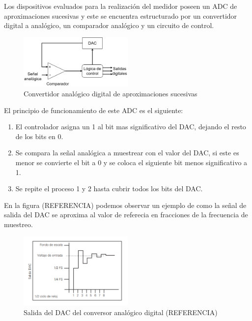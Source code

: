           \par Los dispositivos evaluados para la realización del medidor poseen un ADC de aproximaciones sucesivas y este se encuentra estructurado por un convertidor digital a analógico, un comparador analógico y un circuito de control.

          \begin{figure}[H]
            \centering
            \includegraphics[width=0.5\textwidth]{../Imagenes/ADC.png}
            \caption{Convertidor analógico digital de aproximaciones sucesivas}
            \label{fig:ADC_aproximaciones_sucesivas}
          \end{figure}

          \par El principio de funcionamiento de este ADC es el siguiente:
          \begin{enumerate}
            \item El controlador asigna un 1 al bit mas significativo del DAC, dejando el resto de los bits en 0.
            \item Se compara la señal analógica a muestrear con el valor del DAC, si este es menor se convierte el bit a 0 y se coloca el siguiente bit menos significativo a 1.
            \item Se repite el proceso 1 y 2 hasta cubrir todos los bits del DAC.
          \end{enumerate}

          \par En la figura (REFERENCIA) podemos observar un ejemplo de como la señal de salida del DAC se aproxima al valor de referecia en fracciones de la frecuencia de muestreo.

          \begin{figure}[H]
            \centering
            \includegraphics[width=0.5\textwidth]{../Imagenes/ADC_ejemplo.png}
            \caption{Salida del DAC del conversor analógico digital (REFERENCIA)}
            \label{fig:ADC_DAC_ejemplo}
          \end{figure}





